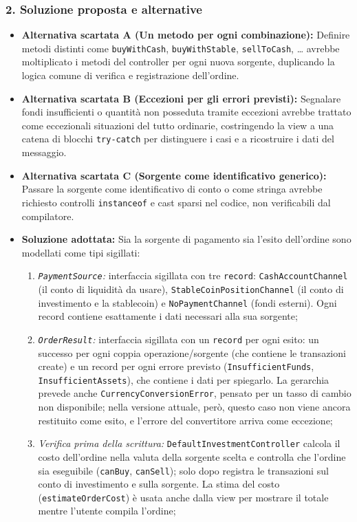 \documentclass[11pt,a4paper,openright]{report}
\begin{document}
\subsubsection*{2. Soluzione proposta e alternative}
\begin{itemize}
    \item \textbf{Alternativa scartata A (Un metodo per ogni combinazione):} Definire metodi distinti come \texttt{buyWithCash}, \texttt{buyWithStable}, \texttt{sellToCash}, \dots{} avrebbe moltiplicato i metodi del controller per ogni nuova sorgente, duplicando la logica comune di verifica e registrazione dell'ordine.
    \item \textbf{Alternativa scartata B (Eccezioni per gli errori previsti):} Segnalare fondi insufficienti o quantità non posseduta tramite eccezioni avrebbe trattato come eccezionali situazioni del tutto ordinarie, costringendo la view a una catena di blocchi \texttt{try-catch} per distinguere i casi e a ricostruire i dati del messaggio.
    \item \textbf{Alternativa scartata C (Sorgente come identificativo generico):} Passare la sorgente come identificativo di conto o come stringa avrebbe richiesto controlli \texttt{instanceof} e cast sparsi nel codice, non verificabili dal compilatore.
    \item \textbf{Soluzione adottata:} Sia la sorgente di pagamento sia l'esito dell'ordine sono modellati come tipi sigillati:
    \begin{enumerate}
        \item \emph{\texttt{PaymentSource}:} interfaccia sigillata con tre \texttt{record}: \texttt{CashAccountChannel} (il conto di liquidità da usare), \texttt{StableCoinPositionChannel} (il conto di investimento e la stablecoin) e \texttt{NoPaymentChannel} (fondi esterni). Ogni record contiene esattamente i dati necessari alla sua sorgente;
        \item \emph{\texttt{OrderResult}:} interfaccia sigillata con un \texttt{record} per ogni esito: un successo per ogni coppia operazione/sorgente (che contiene le transazioni create) e un record per ogni errore previsto (\texttt{InsufficientFunds}, \texttt{InsufficientAssets}), che contiene i dati per spiegarlo. La gerarchia prevede anche \texttt{CurrencyConversionError}, pensato per un tasso di cambio non disponibile; nella versione attuale, però, questo caso non viene ancora restituito come esito, e l'errore del convertitore arriva come eccezione;
        \item \emph{Verifica prima della scrittura:} \texttt{DefaultInvestmentController} calcola il costo dell'ordine nella valuta della sorgente scelta e controlla che l'ordine sia eseguibile (\texttt{canBuy}, \texttt{canSell}); solo dopo registra le transazioni sul conto di investimento e sulla sorgente. La stima del costo (\texttt{estimateOrderCost}) è usata anche dalla view per mostrare il totale mentre l'utente compila l'ordine;

\end{enumerate}
\end{itemize}
\end{document}
